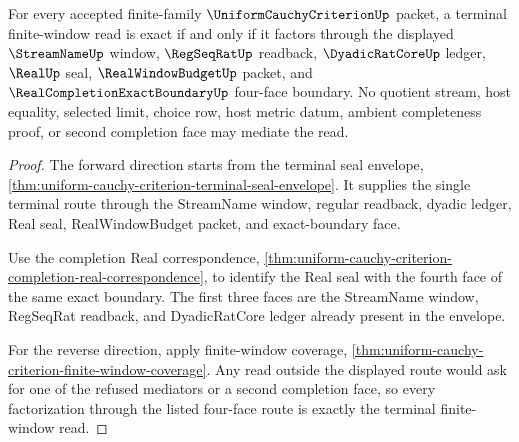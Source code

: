 \begin{theorem}
\label{thm:uniform-cauchy-criterion-terminal-four-face-window-exactness}
For every accepted finite-family $\UniformCauchyCriterionUp$ packet, a terminal finite-window read is exact if and only if it factors through the displayed $\StreamNameUp$ window, $\RegSeqRatUp$ readback, $\DyadicRatCoreUp$ ledger, $\RealUp$ seal, $\RealWindowBudgetUp$ packet, and $\RealCompletionExactBoundaryUp$ four-face boundary. No quotient stream, host equality, selected limit, choice row, host metric datum, ambient completeness proof, or second completion face may mediate the read.
\end{theorem}
\begin{proof}
The forward direction starts from the terminal seal envelope, \autoref{thm:uniform-cauchy-criterion-terminal-seal-envelope}. It supplies the single terminal route through the StreamName window, regular readback, dyadic ledger, Real seal, RealWindowBudget packet, and exact-boundary face.

Use the completion Real correspondence, \autoref{thm:uniform-cauchy-criterion-completion-real-correspondence}, to identify the Real seal with the fourth face of the same exact boundary. The first three faces are the StreamName window, RegSeqRat readback, and DyadicRatCore ledger already present in the envelope.

For the reverse direction, apply finite-window coverage, \autoref{thm:uniform-cauchy-criterion-finite-window-coverage}. Any read outside the displayed route would ask for one of the refused mediators or a second completion face, so every factorization through the listed four-face route is exactly the terminal finite-window read.
\end{proof}

